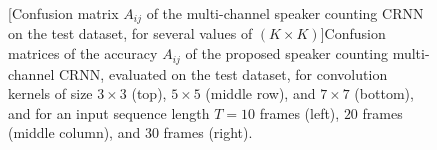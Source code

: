 \begin{figure}[t]
    
    [Confusion matrix $A_{ij}$ of the multi-channel speaker counting CRNN on the test dataset, for several values of $(K \times K)$]{Confusion matrices of the accuracy $A_{ij}$ of the proposed speaker counting multi-channel CRNN, evaluated on the test dataset, for convolution kernels of size $3 \times 3$ (top), $5 \times 5$ (middle row), and $7 \times 7$ (bottom), and for an input sequence length $T=10$ frames (left), $20$ frames (middle column), and $30$ frames (right).}
    \label{fig:confusionMatricesKernelSizes}
\end{figure}

